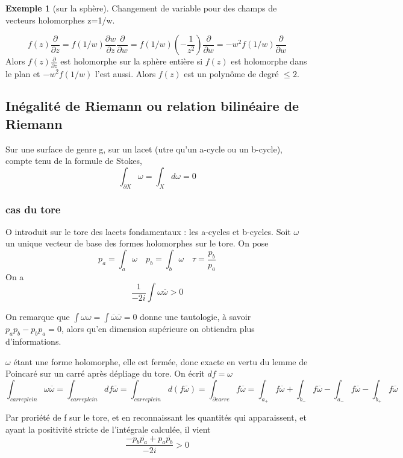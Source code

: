 \documentclass{article}
\theoremstyle{definition} %
\newtheorem{ex}{Exemple}
\newcommand{\1}{\mathbb{1}} %
\begin{document}
\begin{ex}[sur la sphère]
Changement de variable pour des champs de vecteurs holomorphes z=1/w.

$$f(z)\frac{\partial}{\partial z}=f(1/w)\frac{\partial w}{\partial z}\frac{\partial}{\partial w}=f(1/w)\left(-\frac{1}{z^2}\right)\frac{\partial}{\partial w}=-w^2f(1/w)\frac{\partial}{\partial w}
$$
Alors $f(z)\frac{\partial}{\partial z}$ est holomorphe sur la sphère entière si $f(z)$ est holomorphe dans le plan et $-w^2f(1/w)$ l'est aussi. Alors $f(z)$ est un polynôme de degré $\leqslant 2$.

\end{ex}

\subsection{Inégalité de Riemann ou relation bilinéaire de Riemann}

Sur une surface de genre g, sur un lacet (utre qu'un a-cycle ou un b-cycle), compte tenu de la formule de Stokes,
$$\int_{\partial X} \omega = \int_X d \omega = 0$$

\subsubsection{cas du tore}

O introduit sur le tore des lacets fondamentaux : les a-cycles et b-cycles.
Soit $\omega$ un unique vecteur de base des formes holomorphes sur le tore.
On pose 
$$p_a= \int_a \omega \quad  p_b =\int_b \omega  \quad \tau=\frac{p_b}{p_a}$$
On a
$$\frac{1}{-2i} \int \omega \overline{\omega} > 0$$

On remarque que $\int \omega \omega = \int \overline{\omega} \overline{\omega} = 0$ donne une tautologie, à savoir $p_a p_b - p_b p_a =0$, alors qu'en dimension supérieure on obtiendra plus d'informations.

$\omega$ étant une forme holomorphe, elle est fermée, donc exacte en vertu du lemme de Poincaré sur un carré après dépliage du tore.
On écrit $df=\omega$
$$\int_{carre plein} \omega \overline{\omega} = \int_{carre plein} df \overline{\omega} = \int_{carre plein} d(f \overline{\omega}) = \int_{\partial carre} f \overline{\omega}= \int_{a_+} f \overline{\omega} + \int_{b_-} f \overline{\omega} - \int_{a_-} f \overline{\omega} - \int_{b_+} f \overline{\omega}$$

Par proriété de f sur le tore, et en reconnaissant les quantités qui apparaissent, et ayant la positivité stricte de l'intégrale calculée, il vient 
$$\frac{-p_b \overline{p_a} + p_a \overline{p_b} }{-2i} >0$$
\end{document}
